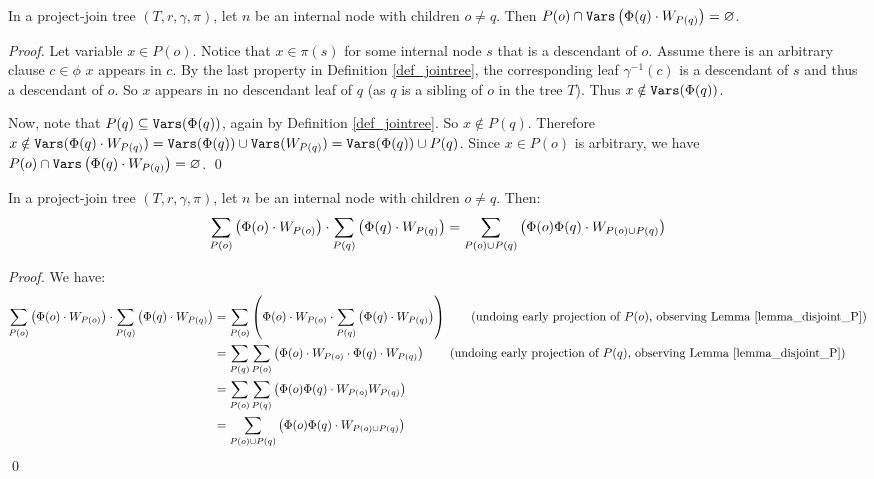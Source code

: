 \begin{lemma}
\label{lemma_disjoint_P}
    In a project-join tree $(T, r, \gamma, \pi)$, let $n$ be an internal node with children $o \ne q$.
    Then $P(o) \cap \texttt{\upshape Vars} \left( \Phi(q) \cdot W_{P(q)} \right) = \varnothing$.
\end{lemma}
\begin{proof}
    Let variable $x \in P(o)$.
    Notice that $x \in \pi(s)$ for some internal node $s$ that is a descendant of $o$.
    Assume there is an arbitrary clause $c \in \phi$ \st{} $x$ appears in $c$.
    By the last property in Definition \ref{def_jointree}, the corresponding leaf $\gamma^{-1}(c)$ is a descendant of $s$ and thus a descendant of $o$.
    So $x$ appears in no descendant leaf of $q$ (as $q$ is a sibling of $o$ in the tree $T$).
    Thus $x \notin \texttt{\upshape Vars}(\Phi(q))$.

    Now, note that $P(q) \subseteq \texttt{\upshape Vars}(\Phi(q))$, again by Definition \ref{def_jointree}.
    So $x \notin P(q)$.
    Therefore $x \notin \texttt{\upshape Vars}(\Phi(q) \cdot W_{P(q)}) = \texttt{\upshape Vars}(\Phi(q)) \cup \texttt{\upshape Vars}(W_{P(q)}) = \texttt{\upshape Vars}(\Phi(q)) \cup P(q)$.
    Since $x \in P(o)$ is arbitrary, we have $P(o) \cap \texttt{\upshape Vars} \left( \Phi(q) \cdot W_{P(q)} \right) = \varnothing$.
\qed
\end{proof}

\begin{lemma}
\label{lemma_late_proj}
    In a project-join tree $(T, r, \gamma, \pi)$, let $n$ be an internal node with children $o \ne q$.
    Then:
    $$\sum_{P(o)} \left(  \Phi(o) \cdot W_{P(o)}  \right) \cdot \sum_{P(q)} \left(  \Phi(q) \cdot W_{P(q)}  \right) = \sum_{P(o) \cup P(q)} \left(  \Phi(o) \Phi(q) \cdot W_{P(o) \cup P(q)}  \right)$$
\end{lemma}
\begin{proof}
    We have:
    \begin{align*}
        \proj_{P(o)} \pars{ \Phi(o) \mult W_{P(o)} } \mult \proj_{P(q)} \pars{ \Phi(q) \mult W_{P(q)} }
        & = \proj_{P(o)} \pars{ \Phi(o) \mult W_{P(o)} \mult \proj_{P(q)} \pars{ \Phi(q) \mult W_{P(q)} } } \tag{undoing early projection of $P(o)$, observing Lemma \ref{lemma_disjoint_P}} \\
        & = \proj_{P(q)} \proj_{P(o)} \pars{ \Phi(o) \mult W_{P(o)} \mult \Phi(q) \mult W_{P(q)} } \tag{undoing early projection of $P(q)$, observing Lemma \ref{lemma_disjoint_P}} \\
        & = \proj_{P(o)} \proj_{P(q)} \pars{ \Phi(o) \Phi(q) \mult W_{P(o)} W_{P(q)} }
        \\
        & = \proj_{P(o) \cup P(q)} \pars{ \Phi(o) \Phi(q) \mult W_{P(o) \cup P(q)} }
    \end{align*}
\qed
\end{proof}

